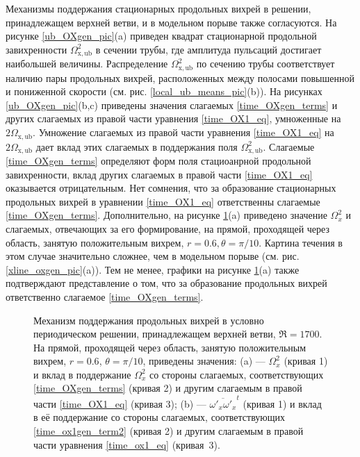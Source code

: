 Механизмы поддержания стационарных продольных вихрей в решении, принадлежащем верхней ветви, и в модельном порыве также согласуются. На рисунке \ref{ub_OXgen_pic}(a) приведен квадрат стационарной продольной завихренности $\Omega_\mathrm{x, ub}^2$ в сечении трубы, где амплитуда пульсаций достигает наибольшей величины. Распределение $\Omega_\mathrm{x,ub}^2$ по сечению трубы соответствует наличию пары продольных вихрей, расположенных между полосами повышенной и пониженной скорости (см. рис. \ref{local_ub_means_pic}(b)). На рисунках \ref{ub_OXgen_pic}(b,c) приведены значения слагаемых \eqref{time_OXgen_terms} и других слагаемых из правой части уравнения \eqref{time_OX1_eq}, умноженные на $2\Omega_\mathrm{x,ub}$. Умножение слагаемых из правой части уравнения \eqref{time_OX1_eq} на $2\Omega_\mathrm{x,ub}$ дает вклад этих слагаемых в поддержания поля $\Omega_\mathrm{x,ub}^2$. Слагаемые \eqref{time_OXgen_terms} определяют форм поля стациоанрной продольной завихренности, вклад других слагаемых в правой части \eqref{time_OX1_eq} оказывается отрицательным. Нет сомнения, что за образование стационарных продольных вихрей в уравнении \eqref{time_OX1_eq} ответственны слагаемые \eqref{time_OXgen_terms}. Дополнительно, на рисунке \ref{ub_oxgen_lines_pic}(a) приведено значение $\Omega_x^2$ и слагаемых, отвечающих за его формирование, на прямой, проходящей через область, занятую положительным вихрем, $r = 0.6, \theta = \pi/10$. Картина течения в этом случае значительно сложнее, чем в модельном порыве (см. рис. \ref{xline_oxgen_pic}(a)). Тем не менее, графики на рисунке \ref{ub_oxgen_lines_pic}(a) также подтверждают представление о том, что за образование продольных вихрей ответственно слагаемое \eqref{time_OXgen_terms}. 
 

\begin{figure}
\caption{Механизм поддержания продольных вихрей в условно периодическом решении, принадлежащем верхней ветви, $\Re = 1700$. На прямой, проходящей через область, занятую положительным вихрем, $r = 0.6$, $\theta = \pi/10$, приведены значения: (a) --- $\Omega_x^2$ (кривая 1) и вклад в поддержание $\Omega_x^2$ со стороны слагаемых, соответствующих \eqref{time_OXgen_terms} (кривая 2) и другим слагаемым в правой части \eqref{time_OX1_eq} (кривая 3); (b) --- $\overline{\omega'_x\omega'_x}^t$ (кривая 1) и вклад в её поддержание со стороны слагаемых, соответствующих \eqref{time_ox1gen_term2} (кривая 2) и другим слагаемым в правой части уравнения \eqref{time_ox1_eq} (кривая~3).} 
\label{ub_oxgen_lines_pic}
\end{figure}


